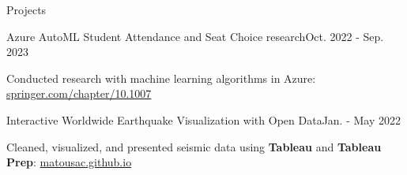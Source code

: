\begin{rSection}{Projects}
  \begin{project}{Azure AutoML Student Attendance and Seat Choice research}{Oct. 2022 - Sep. 2023}
    \item Conducted research with machine learning algorithms in Azure: \href{https://link.springer.com/chapter/10.1007/978-3-031-47721-8_42}{springer.com/chapter/10.1007}
  \end{project}
  \begin{project}{Interactive Worldwide Earthquake Visualization with Open Data}{Jan. - May 2022}
    \item Cleaned, visualized, and presented seismic data using {\bf Tableau} and {\bf Tableau Prep}: \href{https://matousac.github.io/}{matousac.github.io}
  \end{project}
\end{rSection}